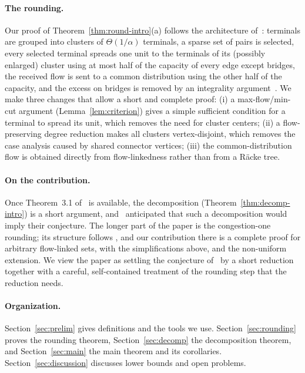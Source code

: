 \documentclass[11pt,letterpaper]{article}
\theoremstyle{definition}
\begin{document}
\paragraph{The rounding.}
Our proof of Theorem~\ref{thm:round-intro}(a) follows the architecture of~\cite[Section~3.4]{CKS13}:
terminals are grouped into clusters of $\Theta(1/\alpha)$ terminals, a sparse set of pairs is
selected, every selected terminal spreads one unit to the terminals of its (possibly
enlarged) cluster using at most half of the capacity of every edge except bridges, the
received flow is sent to a common distribution using the other half of the capacity, and the
excess on bridges is removed by an integrality argument~\cite[Lemma~3.10]{CKS13}. We make
three changes that allow a short and complete proof: (i) a max-flow/min-cut argument
(Lemma~\ref{lem:criterion}) gives a simple sufficient condition for a terminal to spread its
unit, which removes the need for cluster centers; (ii) a flow-preserving degree reduction makes
all clusters vertex-disjoint, which removes the case analysis caused by shared connector
vertices; (iii) the common-distribution flow is obtained directly from flow-linkedness rather
than from a R\"acke tree.

\paragraph{On the contribution.}
Once Theorem~3.1 of~\cite{BJS26} is available, the decomposition (Theorem~\ref{thm:decomp-intro})
is a short argument, and~\cite{BJS26} anticipated that such a decomposition would imply their
conjecture. The longer part of the paper is the congestion-one rounding; its structure follows
\cite[Section~3.4]{CKS13}, and our contribution there is a complete proof for arbitrary
flow-linked sets, with the simplifications above, and the non-uniform extension. We view the
paper as settling the conjecture of~\cite{BJS26} by a short reduction together with a careful,
self-contained treatment of the rounding step that the reduction needs.

\paragraph{Organization.}
Section~\ref{sec:prelim} gives definitions and the tools we use. Section~\ref{sec:rounding}
proves the rounding theorem, Section~\ref{sec:decomp} the decomposition theorem, and
Section~\ref{sec:main} the main theorem and its corollaries. Section~\ref{sec:discussion}
discusses lower bounds and open problems.
\end{document}
